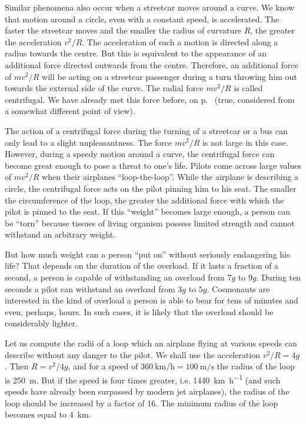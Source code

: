 Similar phenomena also occur when a streetcar moves
around a curve. We know that motion around a circle,
even with a constant speed, is accelerated. The faster the
streetcar moves and the smaller the radius of curvature $R$, the greater the acceleration $v^{2} /R$. The acceleration
of such a motion is directed along a radius towards the
centre. But this is equivalent to the appearance of an
additional force directed outwards from the centre.
Therefore, an additional force of $mv^{2}/R$ will be acting
on a streetcar passenger during a turn throwing him out
towards the external side of the curve. The radial force
$mv^{2}/R$ is called centrifugal. We have already met this
force before, on p.~\pageref{cp} (true, considered from a somewhat
different point of view).

The action of a centrifugal force during the turning of a streetcar or a bus can only lead to a slight unpleasantness. The force $mv^{2}/R$ is not large in this case. However, during a speedy motion around a curve, the centrifugal force can become great enough to pose a threat to one's
life. Pilots come across large values of $mv^{2}/R$ when their
airplanes ``loop-the-loop''. While the airplane is describing a circle, the centrifugal force acts on the pilot pinning him to his seat. The smaller the circumference of the loop, the greater the additional force with which the pilot is pinned to the seat. If this ``weight'' becomes
large enough, a person can be ``torn'' because tissues of living organism possess limited strength and cannot withstand an arbitrary weight.

But how much weight can a person ``put on'' without
seriously endangering his life? That depends on the
duration of the overload. If it lasts a fraction of a second,
a person is capable of withstanding an overload from
$7g$ to $9g$. During ten seconds a pilot can withstand an
overload from $3g$ to $5g$. Cosmonauts are interested in the
kind of overload a person is able to bear for tens of minutes
and even, perhaps, hours. In such cases, it is likely that
the overload should be considerably lighter.

Let us compute the radii of a loop which an airplane
flying at various speeds can describe without any danger
to the pilot. We shall use the acceleration $v^{2}/R = 4g$.
Then $R = v^{2}/4g$, and for a speed of $\SI{360}{\kilo\meter\per\hour} = \SI{100}{\meter\per\second}$ the radius of the loop is \SI{250}{\meter}. But if the speed is four times greater, i.e. \SI{1440}{\kilo\meter\per\hour} (and such speeds have already been surpassed by modern jet airplanes), the radius of the loop should be increased by a factor of 16. The minimum radius of the loop becomes equal to \SI{4}{\kilo\meter}.

